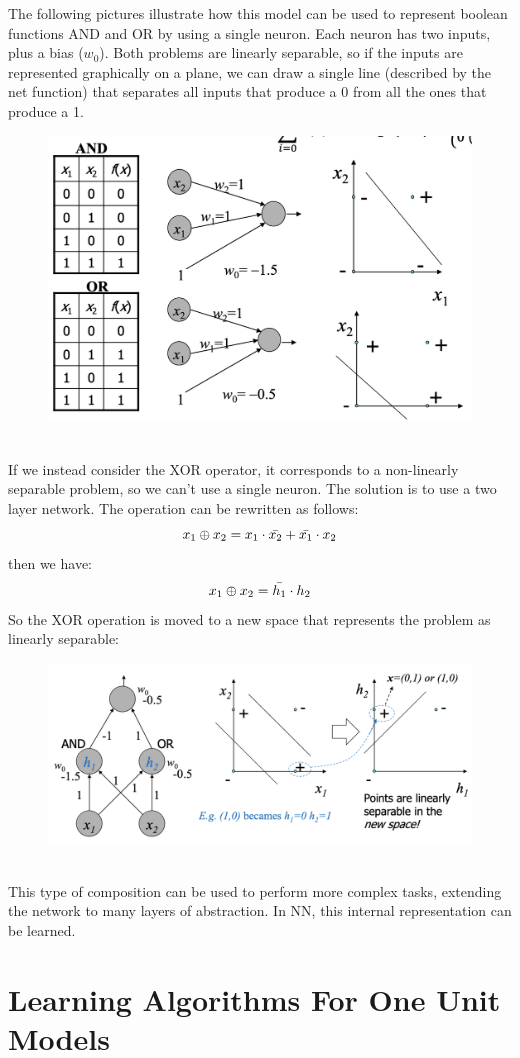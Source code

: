 The following pictures illustrate how this model can be used to represent boolean functions AND and OR by using a single neuron. Each neuron has two inputs, plus a bias ($w_0$). Both problems are linearly separable, so if the inputs are represented graphically on a plane, we can draw a single line (described by the net function) that separates all inputs that produce a 0 from all the ones that produce a 1.
\begin{figure}[ht]
    \centering
    \includegraphics[width=0.5\linewidth]{img/boolean perceptron.png}
\end{figure} \\
If we instead consider the XOR operator, it corresponds to a non-linearly separable problem, so we can't use a single neuron. The solution is to use a two layer network. The operation can be rewritten as follows:
\begin{equation*}
    x_1 \oplus x_2 = x_1 \cdot \Bar{x_2} + \Bar{x_1} \cdot x_2
\end{equation*}
then we have:
\begin{equation*}
    x_1 \oplus x_2 = \Bar{h_1} \cdot h_2
\end{equation*}
So the XOR operation is moved to a new space that represents the problem as linearly separable:
\begin{figure}[ht]
    \centering
    \includegraphics[width=0.55\linewidth]{img/xor perceptron.png}
\end{figure} \\
This type of composition can be used to perform more complex tasks, extending the network to many layers of abstraction. In NN, this internal representation can be learned.

\section{Learning Algorithms For One Unit Models}


